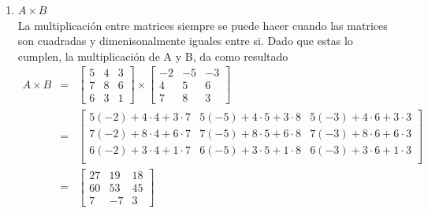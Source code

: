 \documentclass[12pt]{article}
\begin{document}
\begin{enumerate}
\begin{enumerate}
\begin{enumerate}
			\item $A \times B$ \\ La multiplicaci\'on entre matrices siempre se puede hacer cuando las matrices son cuadradas y dimenisonalmente iguales entre si. Dado que estas lo cumplen, la multiplicaci\'on de A y B, da como resultado
				\begin{eqnarray*}
					A \times B &=& 	\begin{bmatrix}
									5 & 4 & 3 \\
									7 & 8 & 6 \\
									6 & 3 & 1
								\end{bmatrix} \times \begin{bmatrix}
									-2&-5 &-3 \\
									4 & 5 & 6 \\
									7 & 8 & 3
								\end{bmatrix} \\
					&=& \begin{bmatrix}
					 		5(-2)+4\cdot 4+3\cdot 7&	5(-5)+4\cdot 5+3\cdot 8&	5(-3)+4\cdot 6+3\cdot 3 \\
							7(-2)+8\cdot 4+6\cdot 7&	7(-5)+8\cdot 5+6\cdot 8&	7(-3)+8\cdot 6+6\cdot 3 \\
							6(-2)+3\cdot 4+1\cdot 7&	6(-5)+3\cdot 5+1\cdot 8&	6(-3)+3\cdot 6+1\cdot 3 \\
						\end{bmatrix} \\
					&=& \begin{bmatrix}
							27 & 19 & 18 \\
							60 & 53 & 45 \\
							 7 & -7 &  3
						\end{bmatrix}
				\end{eqnarray*}
			

\end{enumerate}
\end{enumerate}
\end{enumerate}
\end{document}

